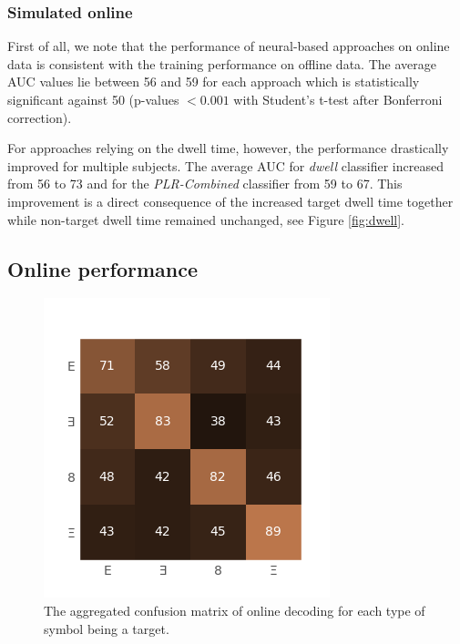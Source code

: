 \documentclass[12pt]{iopart}
\begin{document}
\subsubsection*{Simulated online}
First of all, we note that the performance of neural-based approaches 
on online data is consistent with the training performance on offline data.
The average AUC values lie between 56 and 59 for each approach
which is statistically significant against 50
(p-values $< 0.001$ with Student's t-test after Bonferroni correction).

For approaches relying on the dwell time, however, the performance drastically improved
for multiple subjects. The average AUC for \textit{dwell} classifier increased
from 56 to 73 and for the \textit{PLR-Combined} classifier from 59 to 67.
This improvement is a direct consequence of the increased target dwell time
together while non-target dwell time remained unchanged, see Figure \ref{fig:dwell}.


\subsection{Online performance}

\begin{figure}[!t]
    \includegraphics[trim={0cm 0cm 0cm 0cm},clip,width=0.5\columnwidth]{../images/OnlineConfusion.png}
    \caption{The aggregated confusion matrix of online decoding for each type of symbol being
    a target.}
\label{fig:onlineconf}
\end{figure}
\end{document}
